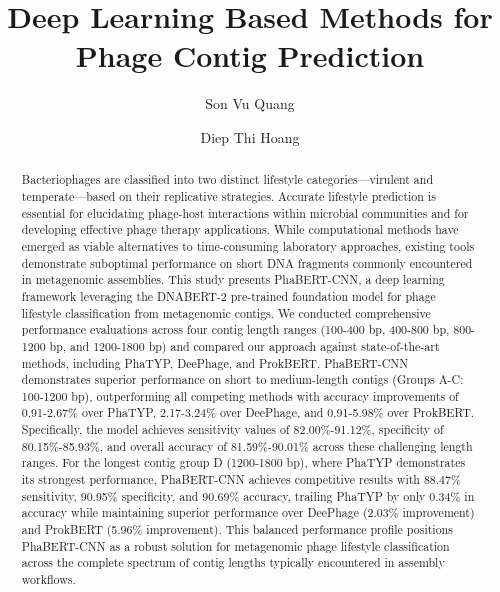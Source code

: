 \documentclass[runningheads]{llncs}
\begin{document}
\title{Deep Learning Based Methods for Phage Contig Prediction}
\author{
Son Vu Quang \and
Diep Thi Hoang
}


\maketitle              %

\begin{abstract}
Bacteriophages are classified into two distinct lifestyle categories—virulent and temperate—based on their replicative strategies. Accurate lifestyle prediction is essential for elucidating phage-host interactions within microbial communities and for developing effective phage therapy applications. While computational methods have emerged as viable alternatives to time-consuming laboratory approaches, existing tools demonstrate suboptimal performance on short DNA fragments commonly encountered in metagenomic assemblies. This study presents PhaBERT-CNN, a deep learning framework leveraging the DNABERT-2\cite{zhou2023dnabert} pre-trained foundation model for phage lifestyle classification from metagenomic contigs. We conducted comprehensive performance evaluations across four contig length ranges (100-400 bp, 400-800 bp, 800-1200 bp, and 1200-1800 bp) and compared our approach against state-of-the-art methods, including PhaTYP\cite{shang2023phatyp}, DeePhage\cite{wu2021deephage}, and ProkBERT\cite{ligeti2024prokbert}. PhaBERT-CNN demonstrates superior performance on short to medium-length contigs (Groups A-C: 100-1200 bp), outperforming all competing methods with accuracy improvements of 0.91-2.67\% over PhaTYP, 2.17-3.24\% over DeePhage, and 0.91-5.98\% over ProkBERT. Specifically, the model achieves sensitivity values of 82.00\%-91.12\%, specificity of 80.15\%-85.93\%, and overall accuracy of 81.59\%-90.01\% across these challenging length ranges. For the longest contig group D (1200-1800 bp), where PhaTYP demonstrates its strongest performance, PhaBERT-CNN achieves competitive results with 88.47\% sensitivity, 90.95\% specificity, and 90.69\% accuracy, trailing PhaTYP by only 0.34\% in accuracy while maintaining superior performance over DeePhage (2.03\% improvement) and ProkBERT (5.96\% improvement). This balanced performance profile positions PhaBERT-CNN as a robust solution for metagenomic phage lifestyle classification across the complete spectrum of contig lengths typically encountered in assembly workflows.

\end{abstract}
%
%
%
\end{document}
